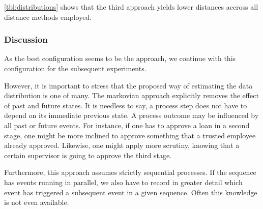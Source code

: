 \documentclass[./../../paper.tex]{subfiles}
\begin{document}
\autoref{tbl:distributions} shows that the third approach yields lower distances accross all distance methods employed.

\subsubsection{Discussion}
As the best configuration seems to be the  approach, we continue with this configuration for the subsequent experiments.

However, it is important to stress that the proposed way of estimating the data distribution is one of many. The markovian approach explicitly removes the effect of past and future states. It is needless to say, a process step does not have to depend on its immediate previous state. A process outcome may be influenced by all past or future events. For instance, if one has to approve a loan in a second stage, one might be more inclined to approve something that a trusted employee already approved. Likewise, one might apply more scrutiny, knowing that a certain supervisor is going to approve the third stage.

Furthermore, this approach assumes strictly sequential processes. If the sequence has events running in parallel, we also have to record in greater detail which event has triggered a subsequent event in a given sequence. Often this knowledge is not even available.

\end{document}
